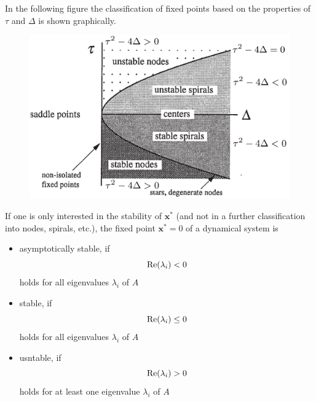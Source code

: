 In the following figure the classification of fixed points based on the properties of $\tau$ and $\Delta$ is shown graphically.
\begin{figure}[H]
  \centering
  \includegraphics[width=.7\linewidth]{Pics/4.19.2.png}
\end{figure}

If one is only interested in the stability of $\textbf{x}^*$ (and not in a further classification into nodes,
spirals, etc.), the fixed point $\textbf{x}^* = 0$ of a dynamical system is
\begin{itemize}
  \item asymptotically stable, if
  \begin{equation}
    \textup{Re}(\lambda_i) < 0
  \end{equation}
  holds for all eigenvalues $\lambda_i$ of $A$

  \item stable, if
  \begin{equation}
    \textup{Re}(\lambda_i) \leq 0
  \end{equation}
  holds for all eigenvalues $\lambda_i$ of $A$

  \item usntable, if
  \begin{equation}
    \textup{Re}(\lambda_i) > 0
  \end{equation}
  holds for at least one eigenvalue $\lambda_i$ of $A$
\end{itemize}

